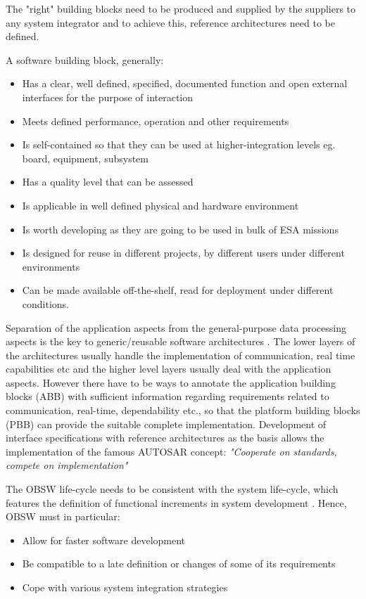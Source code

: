 The "right" building blocks need to be produced and supplied by the suppliers to any system integrator and to achieve this, reference architectures need to be defined.

A software building block, generally:
\begin{itemize}
\item Has a clear, well defined, specified, documented function and open external interfaces for the purpose of interaction
\item Meets defined performance, operation and other requirements
\item Is self-contained so that they can be used at higher-integration levels eg. board, equipment, subsystem 
\item Has a quality level that can be assessed
\item Is applicable in well defined physical and hardware environment
\item Is worth developing as they are going to be used in bulk of ESA missions
\item Is designed for reuse in different projects, by different users under different environments
\item Can be made available off-the-shelf, read for deployment under different conditions.  
\end{itemize}

Separation of the application aspects from the general-purpose data processing aspects is the key to generic/reusable software architectures \cite{PhdThesis}. The lower layers of the architectures usually handle the implementation of communication, real time capabilities etc and the higher level layers usually deal with the application aspects. However there have to be ways to annotate the application building blocks (ABB) with sufficient information regarding requirements related to communication, real-time, dependability etc., so that the platform building blocks (PBB) can provide the suitable complete implementation. Development of interface specifications with reference architectures as the basis allows the implementation of the famous AUTOSAR concept: \textit{"Cooperate on standards, compete on implementation"}\cite{AUTOSARurl}

The OBSW life-cycle needs to be consistent with the system life-cycle, which features the definition of functional increments in system development \cite{SAVOIR}. Hence, OBSW must in particular:

\begin{itemize}
\item Allow for faster software development
\item Be compatible to a late definition or changes of some of its requirements
\item Cope with various system integration strategies
\end{itemize}

